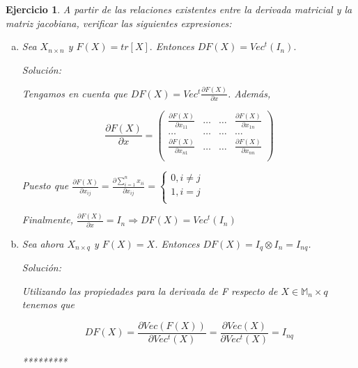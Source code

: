 \documentclass{article}
\theoremstyle{theorem-style}  %
\theoremstyle{definition-style}
\theoremstyle{example-style}
\theoremstyle{exercise-style}
\newtheorem{exercise}{Ejercicio}[section]
\begin{document}
	\begin{exercise}
		A partir de las relaciones existentes entre la derivada matricial y la matriz jacobiana, verificar las siguientes expresiones:
		\begin{enumerate}[a)]
			\item Sea $X_{n\times n}$ y $F(X) = tr[X].$ Entonces $DF(X) = Vec^t(I_n).$
			
			\textit{Solución:}
			
			Tengamos en cuenta que $DF(X)=Vec^t\frac{\partial F(X)}{\partial x}$. Además, 
			
			$$
			\frac{\partial F(X)}{\partial x} = \left({\begin{array}{cccc}
				\frac{\partial F(X)}{\partial x_{11}} & \dots & \dots & \frac{\partial F(X)}{\partial x_{1n}}\\
				\dots & \dots & \dots &\dots\\
				\frac{\partial F(X)}{\partial x_{n1}} & \dots & \dots & \frac{\partial F(X)}{\partial x_{nn}}\\
				\end{array} } \right)
			$$
			
			Puesto que $ \frac{\partial F(X)}{\partial x_{ij}} = \frac{\partial \sum_{i=1}^{n} x_{ii}}{\partial x_{ij}} = \begin{cases}
			0, i \ne j\\
			1, i = j\\
			\end{cases}$
			
			Finalmente, $\frac{\partial F(X)}{\partial x} = I_n \Rightarrow DF(X) = Vec^t(I_n)$
			
			\item Sea ahora $X_{n\times q}$ y $F(X) =X$. Entonces $DF(X) = I_q \otimes I_n = I_{nq}$.
			
			\textit{Solución:}
			
			Utilizando las propiedades para la derivada de F respecto de $X \in \mathbb{M}_n \times q$ tenemos que
			
			$$DF(X) = \frac{\partial Vec(F(X))}{\partial Vec^t(X)} = \frac{\partial Vec(X)}{ \partial Vec^t(X)} = I_{nq}$$
			
			*********
			
		\end{enumerate}
	\end{exercise}
	
\end{document}
